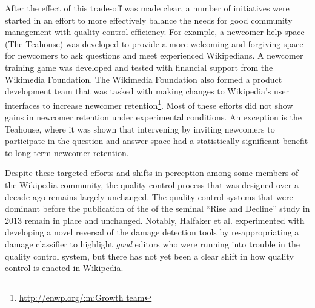 After the effect of this trade-off was made clear, a number of initiatives were started in an effort to more effectively balance the needs for good community management with quality control efficiency.  For example, a newcomer help space (The Teahouse\cite{morgan2013tea}) was developed to provide a more welcoming and forgiving space for newcomers to ask questions and meet experienced Wikipedians.  A newcomer training game was developed and tested with financial support from the Wikimedia Foundation\cite{narayan2015effects}.  The Wikimedia Foundation also formed a product development team that was tasked with making changes to Wikipedia's user interfaces to increase newcomer retention\footnote{\url{http://enwp.org/:m:Growth team}}.  Most of these efforts did not show gains in newcomer retention under experimental conditions.  An exception is the Teahouse, where it was shown that intervening by inviting newcomers to participate in the question and answer space had a statistically significant benefit to long term newcomer retention\cite{morgan2018evaluating}.

Despite these targeted efforts and shifts in perception among some members of the Wikipedia community, the quality control process that was designed over a decade ago remains largely unchanged\cite{halfaker2014snuggle}.  The quality control systems that were dominant before the publication of the of the seminal ``Rise and Decline'' study in 2013\cite{halfaker2013rise} remain in place and unchanged.  Notably, Halfaker et al. experimented with developing a novel reversal of the damage detection tools by re-appropriating a damage classifier to highlight \emph{good} editors who were running into trouble in the quality control system\cite{halfaker2014snuggle}, but there has not yet been a clear shift in how quality control is enacted in Wikipedia.
